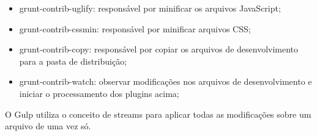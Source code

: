 \begin{itemize}
    \item grunt-contrib-uglify: responsável por minificar os arquivos JavaScript;
    \item grunt-contrib-cssmin: responsável por minificar arquivos CSS;
    \item grunt-contrib-copy: responsável por copiar os arquivos de desenvolvimento para a pasta de distribuição;
    \item grunt-contrib-watch: observar modificações nos arquivos de desenvolvimento e iniciar o processamento dos plugins acima;
\end{itemize}

O Gulp utiliza o conceito de streams para aplicar todas as modificações sobre
um arquivo de uma vez só.



